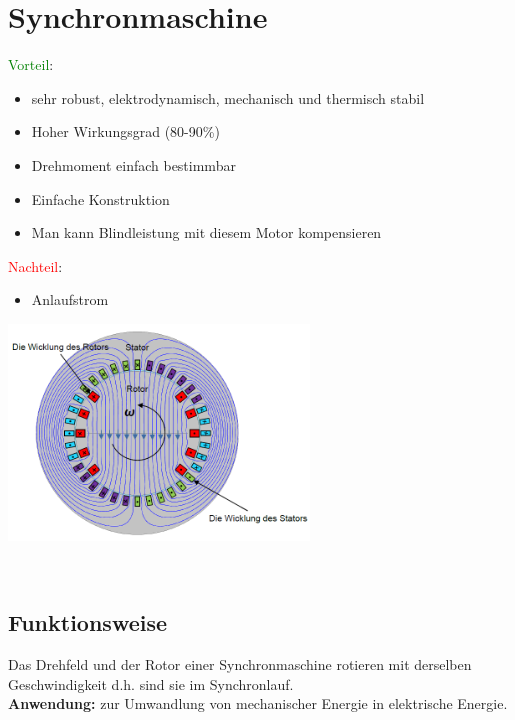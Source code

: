 \section{Synchronmaschine}
    \renewcommand{\arraystretch}{2.5} 
\begin{minipage}{0.5\linewidth}   
\textcolor{green}{Vorteil}:
\begin{itemize} 
	\item sehr robust, elektrodynamisch, mechanisch und thermisch stabil
    \item Hoher Wirkungsgrad (80-90\%)
	\item Drehmoment einfach bestimmbar
	\item Einfache Konstruktion
	\item Man kann Blindleistung mit diesem Motor kompensieren
\end{itemize}
\textcolor{red}{Nachteil}:
\begin{itemize}
\item Anlaufstrom
\end{itemize}
\end{minipage}
\begin{minipage}{0.33\linewidth}
    \includegraphics[width = 8cm]{images/AufbauSynchronmotor}
\end{minipage}
\\
\subsection{Funktionsweise}
Das Drehfeld und der Rotor einer Synchronmaschine rotieren mit derselben Geschwindigkeit d.h. sind sie im Synchronlauf. \\
\textbf{Anwendung:} zur Umwandlung von mechanischer Energie in elektrische Energie.

